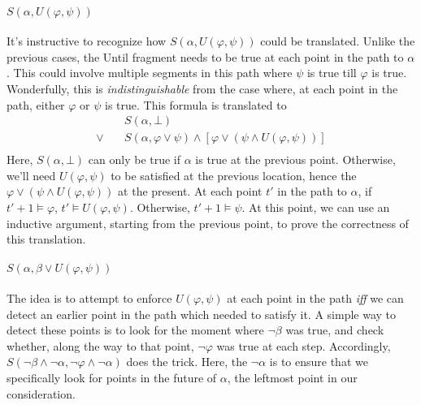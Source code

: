 \documentclass[a4paper,UKenglish,cleveref, autoref, thm-restate, numberwithinsect]{lipics-v2021}
\begin{document}
\paragraph*{$S(\alpha, U(\varphi, \psi))$}
It's instructive to recognize how $S(\alpha, U(\varphi, \psi))$ could be translated. Unlike the previous cases, the Until fragment needs to be true at each point in the path to $\alpha$. This could involve multiple segments in this path where $\psi$ is true till $\varphi$ is true. Wonderfully, this is \textit{indistinguishable} from the case where, at each point in the path, either $\varphi$ or $\psi$ is true. This formula is translated to %
\begin{equation*}
    \begin{aligned}
        &S(\alpha, \bot) \\
        \lor \quad &S(\alpha, \varphi \lor \psi) \land \left[ \varphi \lor \left(\psi \land U\left(\varphi, \psi \right) \right) \right] \\
    \end{aligned}
\end{equation*}
Here, $S(\alpha, \bot)$ can only be true if $\alpha$ is true at the previous point. Otherwise, we'll need $U(\varphi, \psi)$ to be satisfied at the previous location, hence the $\varphi \lor (\psi \land U(\varphi, \psi))$ at the present. At each point $t'$ in the path to $\alpha$, if $t' + 1 \vDash \varphi$, $t' \vDash U(\varphi, \psi)$. Otherwise, $t' + 1 \vDash \psi$. At this point, we can use an inductive argument, starting from the previous point, to prove the correctness of this translation.

\paragraph*{$S(\alpha, \beta \lor U(\varphi, \psi))$}


The idea is to attempt to enforce $U(\varphi, \psi)$ at each point in the path \textit{iff} we can detect an earlier point in the path which needed to satisfy it. A simple way to detect these points is to look for the moment where $\lnot \beta$ was true, and check whether, along the way to that point, $\lnot \varphi$ was true at each step. Accordingly, $S(\lnot \beta \land \lnot \alpha, \lnot \varphi \land \lnot \alpha)$ does the trick. Here, the $\lnot \alpha$ is to ensure that we specifically look for points in the future of $\alpha$, the leftmost point in our consideration.
\end{document}
